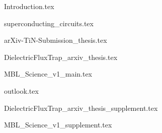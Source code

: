 





\begin{frontmatter}

%




%

%


\cleardoublepage
{}
\begin{singlespace}
\tableofcontents
\end{singlespace}

\end{frontmatter}

\pagestyle{plain} %

%
{Introduction.tex}

{superconducting_circuits.tex}

{arXiv-TiN-Submission_thesis.tex}

{DielectricFluxTrap_arxiv_thesis.tex}

{MBL_Science_v1_main.tex}

{outlook.tex}

\begin{appendices}

{DielectricFluxTrap_arxiv_thesis_supplement.tex}

\inprogress{
}


{MBL_Science_v1_supplement.tex}

\end{appendices}




%
%
\printbibliography


